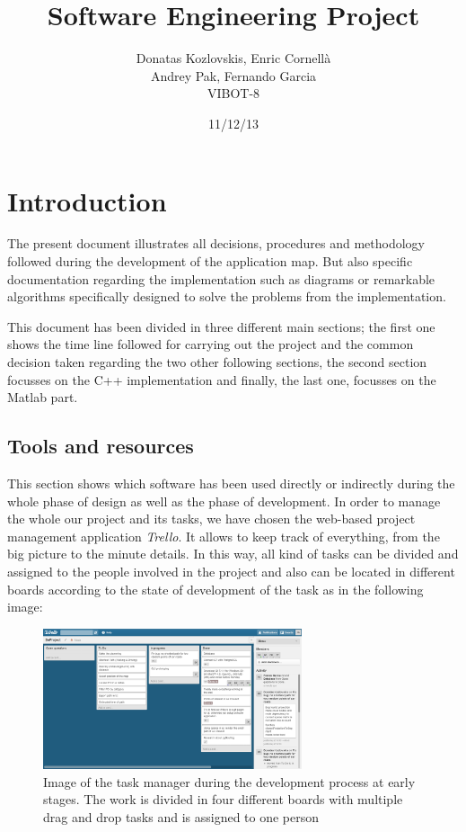 \documentclass{article}
\title{Software Engineering Project}
\author{Donatas Kozlovskis, Enric Cornellà\\
		Andrey Pak,  Fernando Garcia\\
		VIBOT-8}
\date{11/12/13}
\begin{document}
\maketitle

\section{Introduction}

The present document illustrates all decisions, procedures and methodology followed during the development of the application map. But also specific documentation regarding the implementation such as diagrams or remarkable algorithms specifically designed to solve the problems from the implementation.

This document has been divided in three different main sections; the first one shows the time line followed for carrying out the project and the common decision taken regarding the two other following sections, the second section focusses on the C++ implementation and finally, the last one, focusses on the Matlab part. 

\subsection{Tools and resources}
This section shows which software has been used directly or indirectly during the whole phase of design as well as the phase of development.
In order to manage the whole our project and its tasks, we have chosen the web-based project management application \textit{Trello}. It allows to keep track of everything, from the big picture to the minute details. In this way, all kind of tasks can be divided and assigned to the people involved in the project and also can be located in different boards according to the state of development of the task as in the following image:

\begin{figure}[!h]
\centering
\includegraphics[width=0.68\textwidth]{trello.png}
\caption{Image of the task manager during the development process at early stages. The work is divided in four different boards with multiple drag and drop tasks and is assigned to one person}
\end{figure}
\end{document}
